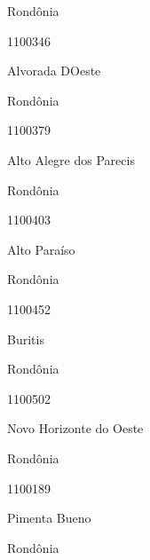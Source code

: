 \documentclass[
  letterpaper,
]{report}
\begin{document}
\n    

\n      

Rondônia

\n      

1100346

\n      

Alvorada D\textquotesingle Oeste

\n    

\n    

\n      

Rondônia

\n      

1100379

\n      

Alto Alegre dos Parecis

\n    

\n    

\n      

Rondônia

\n      

1100403

\n      

Alto Paraíso

\n    

\n    

\n      

Rondônia

\n      

1100452

\n      

Buritis

\n    

\n    

\n      

Rondônia

\n      

1100502

\n      

Novo Horizonte do Oeste

\n    

\n    

\n      

Rondônia

\n      

1100189

\n      

Pimenta Bueno

\n    

\n    

\n      

Rondônia

\n      
\end{document}
